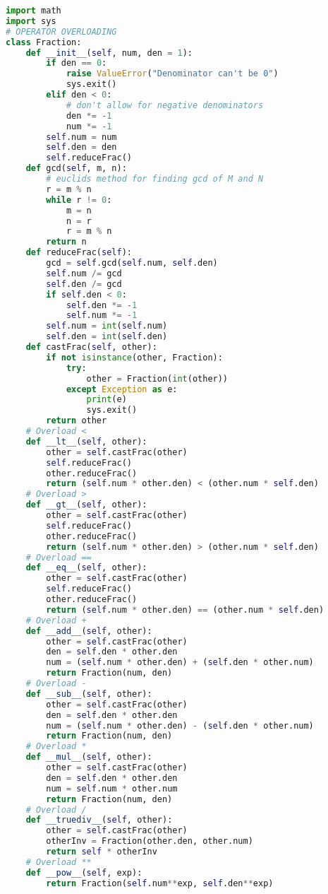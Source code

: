 \documentclass[12pt]{article}
\begin{document}
\begin{lstlisting}[language=Python]
import math
import sys
# OPERATOR OVERLOADING
class Fraction:
    def __init__(self, num, den = 1):
        if den == 0:
            raise ValueError("Denominator can't be 0")
            sys.exit()
        elif den < 0:
            # don't allow for negative denominators
            den *= -1
            num *= -1
        self.num = num
        self.den = den
        self.reduceFrac()
    def gcd(self, m, n):
        # euclids method for finding gcd of M and N
        r = m % n
        while r != 0:
            m = n
            n = r
            r = m % n
        return n
    def reduceFrac(self):
        gcd = self.gcd(self.num, self.den)
        self.num /= gcd
        self.den /= gcd
        if self.den < 0:
            self.den *= -1
            self.num *= -1
        self.num = int(self.num)
        self.den = int(self.den)
    def castFrac(self, other):
        if not isinstance(other, Fraction):
            try:
                other = Fraction(int(other))
            except Exception as e:
                print(e)
                sys.exit()
        return other
    # Overload <
    def __lt__(self, other):
        other = self.castFrac(other)
        self.reduceFrac()
        other.reduceFrac()
        return (self.num * other.den) < (other.num * self.den)
    # Overload >
    def __gt__(self, other):
        other = self.castFrac(other)
        self.reduceFrac()
        other.reduceFrac()
        return (self.num * other.den) > (other.num * self.den)
    # Overload ==
    def __eq__(self, other):
        other = self.castFrac(other)
        self.reduceFrac()
        other.reduceFrac()
        return (self.num * other.den) == (other.num * self.den)
    # Overload +
    def __add__(self, other):
        other = self.castFrac(other)
        den = self.den * other.den
        num = (self.num * other.den) + (self.den * other.num)
        return Fraction(num, den)
    # Overload -
    def __sub__(self, other):
        other = self.castFrac(other)
        den = self.den * other.den
        num = (self.num * other.den) - (self.den * other.num)
        return Fraction(num, den)
    # Overload *
    def __mul__(self, other):
        other = self.castFrac(other)
        den = self.den * other.den
        num = self.num * other.num
        return Fraction(num, den)
    # Overload /
    def __truediv__(self, other):
        other = self.castFrac(other)
        otherInv = Fraction(other.den, other.num)
        return self * otherInv
    # Overload **
    def __pow__(self, exp):
        return Fraction(self.num**exp, self.den**exp)

\end{lstlisting}
\end{document}
